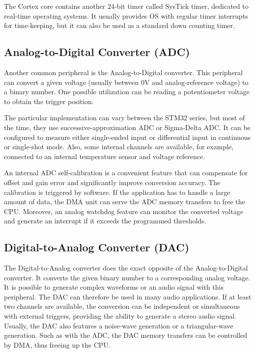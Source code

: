 The Cortex core contains another 24-bit timer called SysTick timer, dedicated to real-time operating systems. It usually provides OS with regular timer interrupts for time-keeping, but it can also be used as a standard down counting timer.

	\subsection{Analog-to-Digital Converter (ADC)}
	\label{sub:adc}
Another common peripheral is the Analog-to-Digital converter. This peripheral can convert a given voltage (usually between 0V and analog-reference voltage) to a binary number. One possible utilization can be reading a potentiometer voltage to obtain the trigger position.

The particular implementation can vary between the STM32 series, but most of the time, they use successive-approximation ADC or Sigma-Delta ADC. It can be configured to measure either single-ended input or differential input in continuous or single-shot mode. Also, some internal channels are available, for example, connected to an internal temperature sensor and voltage reference.

An internal ADC self-calibration is a convenient feature that can compensate for offset and gain error and significantly improve conversion accuracy. The calibration is triggered by software. If the application has to handle a large amount of data, the DMA unit can serve the ADC memory transfers to free the CPU. Moreover, an analog watchdog feature can monitor the converted voltage and generate an interrupt if it exceeds the programmed thresholds. 

	\subsection{Digital-to-Analog Converter (DAC)}
	\label{sub:dac}
The Digital-to-Analog converter does the exact opposite of the Analog-to-Digital converter. It converts the given binary number to a corresponding analog voltage. It is possible to generate complex waveforms or an audio signal with this peripheral. The DAC can therefore be used in many audio applications. If at least two channels are available, the conversion can be independent or simultaneous with external triggers, providing the ability to generate a stereo audio signal. Usually, the DAC also features a noise-wave generation or a triangular-wave generation. Such as with the ADC, the DAC memory transfers can be controlled by DMA, thus freeing up the CPU.

